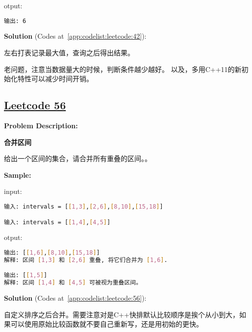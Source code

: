 otput:\par

\begin{lstlisting}[language=bash]
输出: 6
\end{lstlisting}

\textbf{Solution }(Codes at~\ref{app:codelist:leetcode:42}):\par

左右打表记录最大值，查询之后得出结果。\par

老问题，注意当数据量大的时候，判断条件越少越好。
以及，多用C++11的新初始化特性可以减少时间开销。\par



\subsection{\href{https://leetcode-cn.com/}{Leetcode 56}}\label{app:problemlist:leetcode:56}

\textbf{Problem Description:}\par

\textbf{合并区间}\par

给出一个区间的集合，请合并所有重叠的区间。。\par


\textbf{Sample:}\par

input:\par

\begin{lstlisting}[language=bash]
输入: intervals = [[1,3],[2,6],[8,10],[15,18]]

输入: intervals = [[1,4],[4,5]]
\end{lstlisting}

otput:\par

\begin{lstlisting}[language=bash]
输出: [[1,6],[8,10],[15,18]]
解释: 区间 [1,3] 和 [2,6] 重叠, 将它们合并为 [1,6].

输出: [[1,5]]
解释: 区间 [1,4] 和 [4,5] 可被视为重叠区间。
\end{lstlisting}

\textbf{Solution }(Codes at~\ref{app:codelist:leetcode:56}):\par

自定义排序之后合并。需要注意对是C++快排默认比较顺序是挨个从小到大，如果可以使用原始比较函数就不要自己重新写，还是用初始的更快。\par


